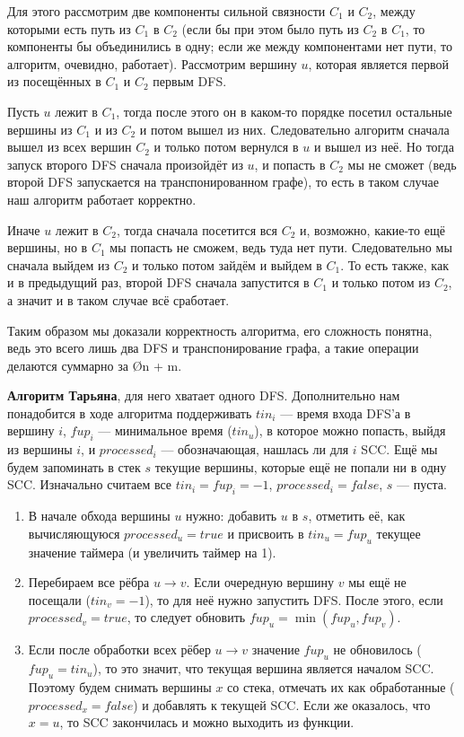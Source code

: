 Для этого рассмотрим две компоненты сильной связности $C_1$ и $C_2$, между которыми есть путь из $C_1$ в $C_2$ (если бы при этом было путь из $C_2$ в $C_1$, то компоненты бы объединились в одну; если же между компонентами нет пути, то алгоритм, очевидно, работает). Рассмотрим вершину $u$, которая является первой из посещённых в $C_1$ и $C_2$ первым DFS.

Пусть $u$ лежит в $C_1$, тогда после этого он в каком-то порядке посетил остальные вершины из $C_1$ и из $C_2$ и потом вышел из них. Следовательно алгоритм сначала вышел из всех вершин $C_2$ и только потом вернулся в $u$ и вышел из неё. Но тогда запуск второго DFS сначала произойдёт из $u$, и попасть в $C_2$ мы не сможет (ведь второй DFS запускается на транспонированном графе), то есть в таком случае наш алгоритм работает корректно.

Иначе $u$ лежит в $C_2$, тогда сначала посетится вся $C_2$ и, возможно, какие-то ещё вершины, но в $C_1$ мы попасть не сможем, ведь туда нет пути. Следовательно мы сначала выйдем из $C_2$ и только потом зайдём и выйдем в $C_1$. То есть также, как и в предыдущий раз, второй DFS сначала запустится в $C_1$ и только потом из $C_2$, а значит и в таком случае всё сработает.

Таким образом мы доказали корректность алгоритма, его сложность понятна, ведь это всего лишь два DFS и транспонирование графа, а такие операции делаются суммарно за \O{n + m}.

\textbf{Алгоритм Тарьяна}, для него хватает одного DFS. Дополнительно нам понадобится в ходе алгоритма поддерживать $tin_i$ — время входа DFS'а в вершину $i$, $fup_i$ — минимальное время ($tin_u$), в которое можно попасть, выйдя из вершины $i$, и $processed_i$ — обозначающая, нашлась ли для $i$ SCC. Ещё мы будем запоминать в стек $s$ текущие вершины, которые ещё не попали ни в одну SCC. Изначально считаем все $tin_i = fup_i = -1$, $processed_i = false$, $s$ — пуста.

\begin{box-algo}
    \begin{enumerate}
        \item В начале обхода вершины $u$ нужно: добавить $u$ в $s$, отметить её, как вычисляющуюся $processed_u = true$ и присвоить в $tin_u = fup_u$ текущее значение таймера (и увеличить таймер на 1).
        \item Перебираем все рёбра $u \to v$. Если очередную вершину $v$ мы ещё не посещали ($tin_v = -1$), то для неё нужно запустить DFS. После этого, если $processed_v = true$, то следует обновить $fup_u = \min(fup_u, fup_v)$.
        \item Если после обработки всех рёбер $u \to v$ значение $fup_u$ не обновилось ($fup_u = tin_u$), то это значит, что текущая вершина является началом SCC. Поэтому будем снимать вершины $x$ со стека, отмечать их как обработанные ($processed_x = false$) и добавлять к текущей SCC. Если же оказалось, что $x = u$, то SCC закончилась и можно выходить из функции.
    \end{enumerate}
\end{box-algo}

